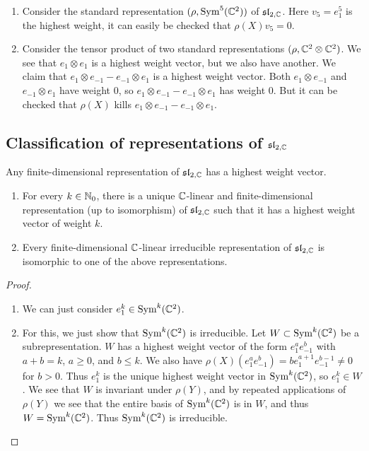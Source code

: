 \begin{example}
    \begin{enumerate}
        \item Consider the standard representation $(\rho, \operatorname{Sym}^5(\mathbb C^2))$ of $\mathfrak{sl}_{2, \mathbb C}$. Here $v_5 = e_1^5$ is the highest weight, it can easily be checked that $\rho(X)v_5 = 0$.
        \item Consider the tensor product of two standard representations $(\rho, \mathbb C^2 \otimes \mathbb C^2)$. We see that $e_1 \otimes e_1$ is a highest weight vector, but we also have another. We claim that $e_1 \otimes e_{-1} - e_{-1} \otimes e_1$ is a highest weight vector. Both $e_1 \otimes e_{-1}$ and $e_{-1} \otimes e_1$ have weight $0$, so $e_1 \otimes e_{-1} - e_{-1} \otimes e_1$ has weight $0$. But it can be checked that $\rho(X)$ kills $e_1 \otimes e_{-1} - e_{-1} \otimes e_1$.
    \end{enumerate}
\end{example}

\subsection{Classification of representations of $\mathfrak{sl}_{2, \mathbb C}$}

\begin{corollary}
    Any finite-dimensional representation of $\mathfrak{sl}_{2, \mathbb C}$ has a highest weight vector.
\end{corollary}

\begin{theorem}
    \begin{enumerate}
        \item For every $k \in \mathbb N_0$, there is a unique $\mathbb C$-linear and finite-dimensional representation (up to isomorphism) of $\mathfrak{sl}_{2, \mathbb C}$ such that it has a highest weight vector of weight $k$.
        \item Every finite-dimensional $\mathbb C$-linear irreducible representation of $\mathfrak{sl}_{2, \mathbb C}$ is isomorphic to one of the above representations.
    \end{enumerate}
\end{theorem}

\begin{proof}
    \begin{enumerate}
        \item We can just consider $e_1^k \in \operatorname{Sym}^k(\mathbb C^2)$.
        \item For this, we just show that $\operatorname{Sym}^k(\mathbb C^2)$ is irreducible. Let $W \subset \operatorname{Sym}^k(\mathbb C^2)$ be a subrepresentation. $W$ has a highest weight vector of the form $e_1^ae_{-1}^b$ with $a+b = k$, $a \geq 0$, and $b \leq k$. We also have $\rho(X)(e_1^ae_{-1}^b) = be_1^{a+1}e_{-1}^{b-1} \neq 0$ for $b > 0$. Thus $e_1^k$ is the unique highest weight vector in $\operatorname{Sym}^k(\mathbb C^2)$, so $e_1^k \in W$. We see that $W$ is invariant under $\rho(Y)$, and by repeated applications of $\rho(Y)$ we see that the entire basis of $\operatorname{Sym}^k(\mathbb C^2)$ is in $W$, and thus $W = \operatorname{Sym}^k(\mathbb C^2)$. Thus $\operatorname{Sym}^k(\mathbb C^2)$ is irreducible.
    \end{enumerate}
\end{proof}


